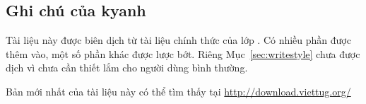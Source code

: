 
\subsection*{\texorpdfstring{Ghi chú của kyanh}{Ghi chu cua kyanh}}

Tài liệu này được biên dịch từ tài liệu chính thức của lớp .
Có nhiều phần được thêm vào, một số phần khác được lược bớt.
Riêng Mục~\vref{sec:writestyle} chưa được dịch vì chưa cần thiết lắm
cho người dùng bình thường.


\medskip
Bản mới nhất của tài liệu này có thể tìm thấy tại
\url{http://download.viettug.org/}


\endinput
